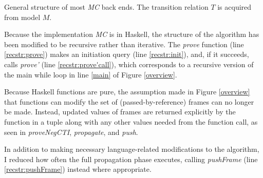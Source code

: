\documentclass[12pt,a4paper,twoside,openright]{report}
\begin{document}
{{
\begin{algorithm}[t]
\DontPrintSemicolon
{}
\caption{General structure of most \emph{MC} back ends. The transition relation $T$ is acquired
from model $M$.}
\label{recstr}
\end{algorithm}

Because the implementation \emph{MC} is in Haskell, the
structure of the algorithm has been modified to be recursive rather than iterative.
The {\it prove} function (line \ref{recstr:prove}) makes an initiation query
(line \ref{recstr:init}), and, if it succeeds, calls
{\it prove'} (line \ref{recstr:prove'call}),
which corresponds to a recursive version of the main while loop
in line \ref{main} of Figure \ref{overview}.

Because Haskell functions are pure, the assumption made in Figure \ref{overview}
that functions can modify the set of (passed-by-reference) frames can no longer be made.
Instead, updated values of frames are returned explicitly by the function in
a tuple along with any other values needed from the function call, as seen in
{\it proveNegCTI}, {\it propagate}, and {\it push}.

In addition to making necessary language-related modifications to the algorithm, I 
reduced how often the full propagation phase executes, calling {\it pushFrame}
(line \ref{recstr:pushFrame}) instead where appropriate.

}}
\end{document}
